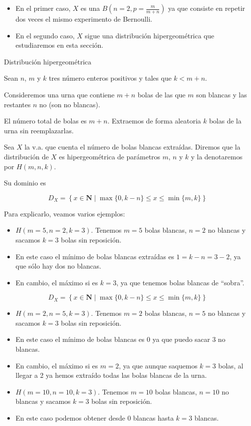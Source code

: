 \documentclass[
  letterpaper,
  DIV=11,
  numbers=noendperiod]{scrreprt}
\providecommand{\tightlist}{%
  \setlength{\itemsep}{0pt}\setlength{\parskip}{0pt}}\usepackage{longtable,booktabs,array}
\begin{document}
\begin{itemize}
\tightlist
\item
  En el primer caso, \(X\) es una \(B(n=2,p=\frac{m}{m+n})\) ya que
  consiste en repetir dos veces el mismo experimento de Bernoulli.
\item
  En el segundo caso, \(X\) sigue una distribución hipergeométrica que
  estudiaremos en esta sección.
\end{itemize}

Distribución hipergeométrica

Sean \(n\), \(m\) y \(k\) tres número enteros positivos y tales que
\(k<m+n\).

Consideremos una urna que contiene \(m+n\) bolas de las que \(m\) son
blancas y las restantes \(n\) no (son no blancas).

El número total de bolas es \(m+n\). Extraemos de forma aleatoria \(k\)
bolas de la urna sin reemplazarlas.

Sea \(X\) la v.a. que cuenta el número de bolas blancas extraídas.
Diremos que la distribución de \(X\) es hipergeométrica de parámetros
\(m\), \(n\) y \(k\) y la denotaremos por \(H(m,n,k)\).

Su dominio es

\[D_X=\left\{x\in\mathbf{N}\mid \max\{0,k-n\}\leq x \leq \min\{m,k\}\right\}\]

Para explicarlo, veamos varios ejemplos:

\begin{itemize}
\tightlist
\item
  \(H(m=5,n=2,k=3)\). Tenemos \(m=5\) bolas blancas, \(n=2\) no blancas
  y sacamos \(k=3\) bolas sin reposición.
\item
  En este caso el mínimo de bolas blancas extraídas es \(1=k-n=3-2\), ya
  que sólo hay dos no blancas.
\item
  En cambio, el máximo si es \(k=3\), ya que tenemos bolas blancas de
  ``sobra''.
\end{itemize}

\[D_X=\left\{x\in\mathbf{N}\mid \max\{0,k-n\}\leq x \leq \min\{m,k\}\right\}\]

\begin{itemize}
\item
  \(H(m=2,n=5,k=3)\). Tenemos \(m=2\) bolas blancas, \(n=5\) no blancas
  y sacamos \(k=3\) bolas sin reposición.
\item
  En este caso el mínimo de bolas blancas es \(0\) ya que puedo sacar 3
  no blancas.
\item
  En cambio, el máximo si es \(m=2\), ya que aunque saquemos \(k=3\)
  bolas, al llegar a 2 ya hemos extraído todas las bolas blancas de la
  urna.
\item
  \(H(m=10,n=10,k=3)\). Tenemos \(m=10\) bolas blancas, \(n=10\) no
  blancas y sacamos \(k=3\) bolas sin reposición.
\item
  En este caso podemos obtener desde \(0\) blancas hasta \(k=3\)
  blancas.
\end{itemize}
\end{document}
